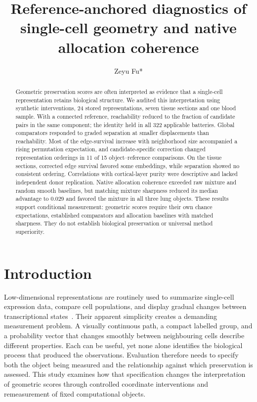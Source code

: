 \documentclass[11pt]{article}
\title{Reference-anchored diagnostics of single-cell geometry and native allocation coherence}
\author[1]{Zeyu Fu*}
\affil[1]{\hspace{0.2em}State Key Laboratory of Trauma and Chemical Poisoning, Institute of Combined Injury,
Chongqing Engineering Research Center for Nanomedicine, College of Preventive Medicine,
Army Medical University, Chongqing, China\\\texttt{fuzeyu09@gmail.com}}
\date{}
\begin{document}
\maketitle

\begin{abstract}
Geometric preservation scores are often interpreted as evidence that a single-cell representation retains biological structure. We audited this interpretation using synthetic interventions, 24 stored representations, seven tissue sections and one blood sample. With a connected reference, reachability reduced to the fraction of candidate pairs in the same component; the identity held in all 322 applicable batteries. Global comparators responded to graded separation at smaller displacements than reachability. Most of the edge-survival increase with neighborhood size accompanied a rising permutation expectation, and candidate-specific correction changed representation orderings in 11 of 15 object--reference comparisons. On the tissue sections, corrected edge survival favored some embeddings, while separation showed no consistent ordering. Correlations with cortical-layer purity were descriptive and lacked independent donor replication. Native allocation coherence exceeded raw mixture and random smooth baselines, but matching mixture sharpness reduced its median advantage to 0.029 and favored the mixture in all three lung objects. These results support conditional measurement: geometric scores require their own chance expectations, established comparators and allocation baselines with matched sharpness. They do not establish biological preservation or universal method superiority.
\end{abstract}

\section{Introduction}

Low-dimensional representations are routinely used to summarize single-cell expression data, compare cell populations, and display gradual changes between transcriptional states~\cite{luecken2019practices,becht2019umap}. Their apparent simplicity creates a demanding measurement problem. A visually continuous path, a compact labelled group, and a probability vector that changes smoothly between neighbouring cells describe different properties. Each can be useful, yet none alone identifies the biological process that produced the observations. Evaluation therefore needs to specify both the object being measured and the relationship against which preservation is assessed. This study examines how that specification changes the interpretation of geometric scores through controlled coordinate interventions and remeasurement of fixed computational objects.
\end{document}
